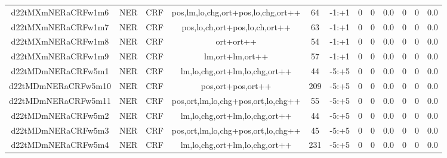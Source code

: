 \documentclass[a4paper]{article}
\begin{document}
\begin{landscape}
\begin{center}
\begin{tabular}{ |c|c|c|c|c|c|c|c|c|c|c|c|}
 
 	
 	\small{ d22tMXmNERaCRFw1m6 } & \small{ NER} & \small{  CRF }  & pos,lm,lo,chg,ort+pos,lo,chg,ort++  &  64 &  \small{  -1:+1 }  &  0 & 0 & 0.0  &  0 & 0 & 0.0 \\
 	

 
 	
 	\small{ d22tMXmNERaCRFw1m7 } & \small{ NER} & \small{  CRF }  & pos,lo,ch,ort+pos,lo,ch,ort++  &  63 &  \small{  -1:+1 }  &  0 & 0 & 0.0  &  0 & 0 & 0.0 \\
 	

 
 	
 	\small{ d22tMXmNERaCRFw1m8 } & \small{ NER} & \small{  CRF }  & ort+ort++  &  54 &  \small{  -1:+1 }  &  0 & 0 & 0.0  &  0 & 0 & 0.0 \\
 	

 
 	
 	\small{ d22tMXmNERaCRFw1m9 } & \small{ NER} & \small{  CRF }  & lm,ort+lm,ort++  &  57 &  \small{  -1:+1 }  &  0 & 0 & 0.0  &  0 & 0 & 0.0 \\
 	

 
 	
 	\small{ d22tMDmNERaCRFw5m1 } & \small{ NER} & \small{  CRF }  & lm,lo,chg,ort+lm,lo,chg,ort++  &  44 &  \small{  -5:+5 }  &  0 & 0 & 0.0  &  0 & 0 & 0.0 \\
 	

 
 	
 	\small{ d22tMDmNERaCRFw5m10 } & \small{ NER} & \small{  CRF }  & pos,ort+pos,ort++  &  209 &  \small{  -5:+5 }  &  0 & 0 & 0.0  &  0 & 0 & 0.0 \\
 	

 
 	
 	\small{ d22tMDmNERaCRFw5m11 } & \small{ NER} & \small{  CRF }  & pos,ort,lm,lo,chg+pos,ort,lo,chg++  &  55 &  \small{  -5:+5 }  &  0 & 0 & 0.0  &  0 & 0 & 0.0 \\
 	

 
 	
 	\small{ d22tMDmNERaCRFw5m2 } & \small{ NER} & \small{  CRF }  & lm,lo,chg,ort+lm,lo,chg,ort++  &  44 &  \small{  -5:+5 }  &  0 & 0 & 0.0  &  0 & 0 & 0.0 \\
 	

 
 	
 	\small{ d22tMDmNERaCRFw5m3 } & \small{ NER} & \small{  CRF }  & pos,ort,lm,lo,chg+pos,ort,lo,chg++  &  45 &  \small{  -5:+5 }  &  0 & 0 & 0.0  &  0 & 0 & 0.0 \\
 	

 
 	
 	\small{ d22tMDmNERaCRFw5m4 } & \small{ NER} & \small{  CRF }  & lm,lo,chg,ort+lm,lo,chg,ort++  &  231 &  \small{  -5:+5 }  &  0 & 0 & 0.0  &  0 & 0 & 0.0 \\
 	


\end{tabular}
\end{center}
\end{landscape}
\end{document}
